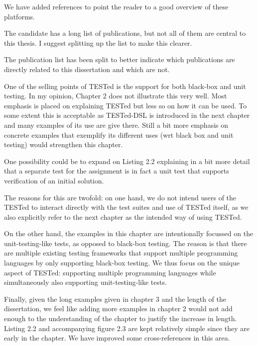 \documentclass[
    paper=a4,
    paper=portrait,
    parskip=half,
]{scrartcl}
\newenvironment{point}{%
    \itshape%
  }{%
    \nopagebreak%
}
\newenvironment{reply}{}{%
    \vspace{0.8cm}
}
\begin{document}
\begin{reply}
    We have added references to point the reader to a good overview of these platforms.
\end{reply}

\begin{point}
    The candidate has a long list of publications, but not all of them are central to this thesis.
    I suggest splitting up the list to make this clearer.
\end{point}

\begin{reply}
    The publication list has been split to better indicate which publications are directly related to this dissertation and which are not.
\end{reply}

\begin{point}
    One of the selling points of TESTed is the support for both black-box and unit testing.
    In my opinion, Chapter 2 does not illustrate this very well.
    Most emphasis is placed on explaining TESTed but less so on how it can be used.
    To some extent this is acceptable as TESTed-DSL is introduced in the next chapter and many examples of its use are give there.
    Still a bit more emphasis on concrete examples that exemplify its different uses (wrt black box and unit testing) would strengthen this chapter.

    One possibility could be to expand on Listing 2.2 explaining in a bit more detail that a separate test for the assignment is in fact a unit test that supports verification of an initial solution.
\end{point}

\begin{reply}
    The reasons for this are twofold: on one hand, we do not intend users of the TESTed to interact directly with the test suites and use of TESTed itself, as we also explicitly refer to the next chapter as the intended way of using TESTed.

    On the other hand, the examples in this chapter are intentionally focussed on the unit-testing-like tests, as opposed to black-box testing.
    The reason is that there are multiple existing testing frameworks that support multiple programming languages by only supporting black-box testing.
    We thus focus on the unique aspect of TESTed: supporting multiple programming languages while simultaneously also supporting unit-testing-like tests.

    Finally, given the long examples given in chapter 3 and the length of the dissertation, we feel like adding more examples in chapter 2 would not add enough to the understanding of the chapter to justify the increase in length.
    Listing 2.2 and accompanying figure 2.3 are kept relatively simple since they are early in the chapter.
    We have improved some cross-references in this area.
\end{reply}
\end{document}
